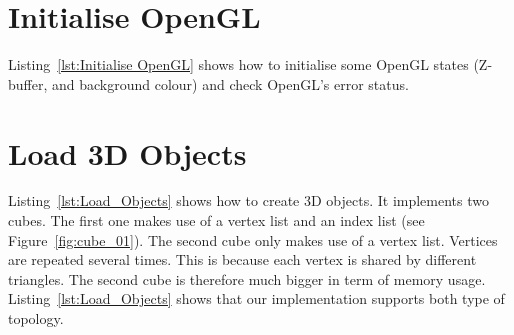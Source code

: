 \documentclass[11pt,oneside,a4paper,final]{article}
\begin{document}
\section{Initialise OpenGL}
\label{sec:Initialise OpenGL}

Listing~\ref{lst:Initialise OpenGL} shows how to initialise some OpenGL states 
(Z-buffer, and background colour) and check OpenGL's error status. 

\begin{center}

\end{center}


\section{Load 3D Objects}
\label{sec:Load Objects}

Listing~\ref{lst:Load_Objects} shows how to create 3D objects. It 
implements 
two cubes. The first one makes use of a vertex list and an index list (see 
Figure~\ref{fig:cube_01}). The second cube only makes use of a vertex list. 
Vertices are repeated several times. This is because each vertex is shared by 
different triangles. The second cube is therefore much bigger in term of 
memory usage. Listing~\ref{lst:Load_Objects} shows that our implementation 
supports both type of topology.
\end{document}
